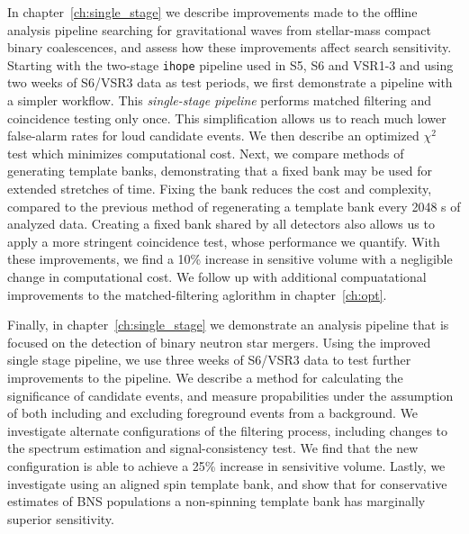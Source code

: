 In chapter~\ref{ch:single_stage} we describe improvements
made to the offline analysis pipeline searching for gravitational waves from
stellar-mass compact binary coalescences, and assess how these improvements
affect search sensitivity. Starting with the two-stage \texttt{ihope} pipeline
used in S5, S6 and VSR1-3 and using two weeks of S6/VSR3 data as test periods,
we first demonstrate a pipeline with a simpler workflow. This
\emph{single-stage pipeline} performs matched filtering and coincidence
testing only once. This simplification allows us to reach much lower
false-alarm rates for loud candidate events. We then describe an optimized
$\chi^2$ test which minimizes computational cost. Next, we compare methods of
generating template banks, demonstrating that a fixed bank may be used for
extended stretches of time. Fixing the bank reduces the cost and complexity,
compared to the previous method of regenerating a template bank every 2048 s
of analyzed data. Creating a fixed bank shared by all detectors also allows us
to apply a more stringent coincidence test, whose performance we quantify.
With these improvements, we find a 10\% increase in sensitive volume
with a negligible change in computational cost. We follow up with additional
compuatational improvements to the matched-filtering aglorithm in chapter~\ref{ch:opt}.

Finally, in chapter~\ref{ch:single_stage} we demonstrate an analysis pipeline
that is focused on the detection of binary neutron star mergers. Using the 
improved single stage pipeline, we use three weeks of S6/VSR3 data to test 
further improvements to the pipeline. We describe a method for calculating
the significance of candidate events, and measure propabilities under the
assumption of both including and excluding foreground events from a background.
We investigate alternate configurations of the filtering process, including changes
to the spectrum estimation and signal-consistency test. We find that
the new configuration is able to achieve a 25\% increase in sensivitive volume. Lastly,
we investigate using an aligned spin template bank, and show that for conservative 
estimates of BNS populations a non-spinning template bank has marginally superior 
sensitivity.



